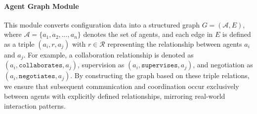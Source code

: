 
\paragraph{Agent Graph Module}
This module converts configuration data into a structured graph \(G = (\mathcal{A}, E)\), where \(\mathcal{A} = \{a_1, a_2, \dots, a_n\}\) denotes the set of agents, and each edge in \(E\) is defined as a triple \((a_i, r, a_j)\) with \(r \in \mathcal{R}\) representing the relationship between agents \(a_i\) and \(a_j\). For example, a collaboration relationship is denoted as \((a_i, \texttt{collaborates}, a_j)\), supervision as \((a_i, \texttt{supervises}, a_j)\), and negotiation as \((a_i, \texttt{negotiates}, a_j)\). By constructing the graph based on these triple relations, we ensure that subsequent communication and coordination occur exclusively between agents with explicitly defined relationships, mirroring real-world interaction patterns.



